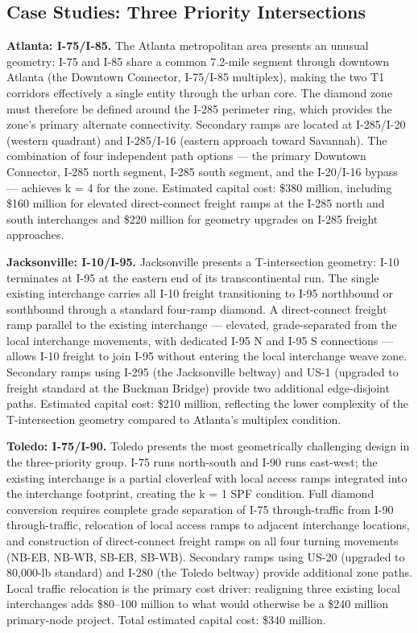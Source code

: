 \subsection{Case Studies: Three Priority Intersections}

\textbf{Atlanta: I-75/I-85.} The Atlanta metropolitan area presents an unusual geometry: I-75 and I-85 share a common 7.2-mile segment through downtown Atlanta (the Downtown Connector, I-75/I-85 multiplex), making the two T1 corridors effectively a single entity through the urban core. The diamond zone must therefore be defined around the I-285 perimeter ring, which provides the zone's primary alternate connectivity. Secondary ramps are located at I-285/I-20 (western quadrant) and I-285/I-16 (eastern approach toward Savannah). The combination of four independent path options --- the primary Downtown Connector, I-285 north segment, I-285 south segment, and the I-20/I-16 bypass --- achieves k = 4 for the zone. Estimated capital cost: \$380 million, including \$160 million for elevated direct-connect freight ramps at the I-285 north and south interchanges and \$220 million for geometry upgrades on I-285 freight approaches.

\textbf{Jacksonville: I-10/I-95.} Jacksonville presents a T-intersection geometry: I-10 terminates at I-95 at the eastern end of its transcontinental run. The single existing interchange carries all I-10 freight transitioning to I-95 northbound or southbound through a standard four-ramp diamond. A direct-connect freight ramp parallel to the existing interchange --- elevated, grade-separated from the local interchange movements, with dedicated I-95 N and I-95 S connections --- allows I-10 freight to join I-95 without entering the local interchange weave zone. Secondary ramps using I-295 (the Jacksonville beltway) and US-1 (upgraded to freight standard at the Buckman Bridge) provide two additional edge-disjoint paths. Estimated capital cost: \$210 million, reflecting the lower complexity of the T-intersection geometry compared to Atlanta's multiplex condition.

\textbf{Toledo: I-75/I-90.} Toledo presents the most geometrically challenging design in the three-priority group. I-75 runs north-south and I-90 runs east-west; the existing interchange is a partial cloverleaf with local access ramps integrated into the interchange footprint, creating the k = 1 SPF condition. Full diamond conversion requires complete grade separation of I-75 through-traffic from I-90 through-traffic, relocation of local access ramps to adjacent interchange locations, and construction of direct-connect freight ramps on all four turning movements (NB-EB, NB-WB, SB-EB, SB-WB). Secondary ramps using US-20 (upgraded to 80,000-lb standard) and I-280 (the Toledo beltway) provide additional zone paths. Local traffic relocation is the primary cost driver: realigning three existing local interchanges adds \$80--100 million to what would otherwise be a \$240 million primary-node project. Total estimated capital cost: \$340 million.

